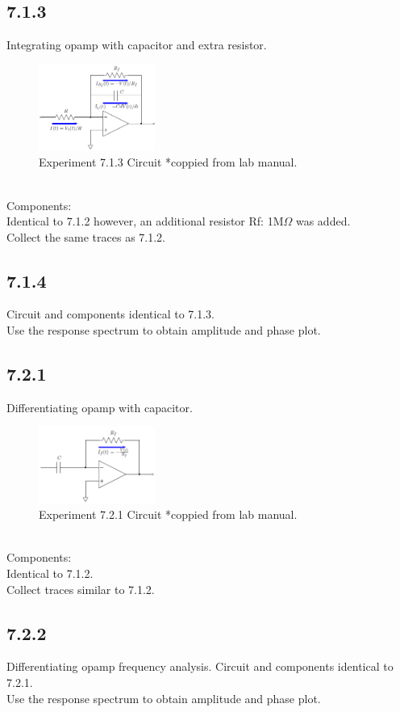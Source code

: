 \documentclass[a4paper,12pt]{article}
\begin{document}
\subsection*{7.1.3}

Integrating opamp with capacitor and extra resistor.
\begin{figure}[h]
\centering
\includegraphics[width=1.5in]{7.1.3/Circuit_Diagram.png}
\caption{Experiment 7.1.3 Circuit *coppied from lab manual.}
\end{figure}\\
Components:\\
Identical to 7.1.2 however, an additional resistor Rf: 1M$\Omega$ was added.\\
Collect the same traces as 7.1.2.\\
\subsection*{7.1.4}
Circuit and components identical to 7.1.3.\\
Use the response spectrum to obtain amplitude and phase plot.\\
\newpage
\subsection*{7.2.1}
Differentiating opamp with capacitor.
\begin{figure}[h]
\centering
\includegraphics[width=1.5in]{7.2.1/Circuit_Diagram.png}
\caption{Experiment 7.2.1 Circuit *coppied from lab manual.}
\end{figure}\\
Components:\\
Identical to 7.1.2.\\
Collect traces similar to 7.1.2.
\subsection*{7.2.2}
Differentiating opamp frequency analysis.
Circuit and components identical to 7.2.1.\\
Use the response spectrum to obtain amplitude and phase plot.
\newpage
\end{document}
